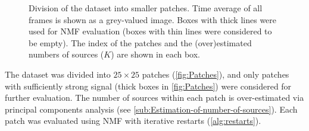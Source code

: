 \begin{figure}[!htb]
	\centering
	\caption{Division of the dataset into smaller patches. Time average of all frames is shown as a grey-valued image. Boxes with thick lines were used for NMF evaluation (boxes with thin lines were considered to be empty). The index of the patches and the (over)estimated numbers of sources ($K$) are shown in each box.}
	\label{fig:Patches}
\end{figure}
%
The dataset was divided into $25 \times 25$ patches (\autoref{fig:Patches}), and only patches with sufficiently strong signal (thick boxes in \autoref{fig:Patches}) were considered for further evaluation. The number of sources within each patch is over-estimated via principal components analysis (see \autoref{sub:Estimation-of-number-of-sources}). Each patch was evaluated using NMF with iterative restarts (\autoref{alg:restarts}).

